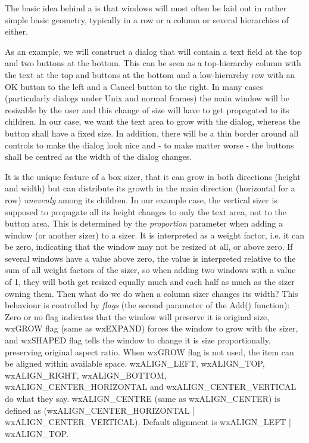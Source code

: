 The basic idea behind a  is that windows will most often be laid out in rather
simple basic geometry, typically in a row or a column or several hierarchies of either.

As an example, we will construct a dialog that will contain a text field at the top and
two buttons at the bottom. This can be seen as a top-hierarchy column with the text at
the top and buttons at the bottom and a low-hierarchy row with an OK button to the left
and a Cancel button to the right. In many cases (particularly dialogs under Unix and
normal frames) the main window will be resizable by the user and this change of size
will have to get propagated to its children. In our case, we want the text area to grow
with the dialog, whereas the button shall have a fixed size. In addition, there will be
a thin border around all controls to make the dialog look nice and - to make matter worse -
the buttons shall be centred as the width of the dialog changes.

It is the unique feature of a box sizer, that it can grow in both directions (height and
width) but can distribute its growth in the main direction (horizontal for a row) {\it unevenly} 
among its children. In our example case, the vertical sizer is supposed to propagate all its
height changes to only the text area, not to the button area. This is determined by the {\it proportion} parameter
when adding a window (or another sizer) to a sizer. It is interpreted
as a weight factor, i.e. it can be zero, indicating that the window may not be resized
at all, or above zero. If several windows have a value above zero, the value is interpreted
relative to the sum of all weight factors of the sizer, so when adding two windows with
a value of 1, they will both get resized equally much and each half as much as the sizer
owning them. Then what do we do when a column sizer changes its width? This behaviour is
controlled by {\it flags} (the second parameter of the Add() function): Zero or no flag
indicates that the window will preserve it is original size, wxGROW flag (same as wxEXPAND)
forces the window to grow with the sizer, and wxSHAPED flag tells the window to change it is
size proportionally, preserving original aspect ratio.  When wxGROW flag is not used,
the item can be aligned within available space.  wxALIGN\_LEFT, wxALIGN\_TOP, wxALIGN\_RIGHT,
wxALIGN\_BOTTOM, wxALIGN\_CENTER\_HORIZONTAL and wxALIGN\_CENTER\_VERTICAL do what they say.
wxALIGN\_CENTRE (same as wxALIGN\_CENTER) is defined as (wxALIGN\_CENTER\_HORIZONTAL |
wxALIGN\_CENTER\_VERTICAL).  Default alignment is wxALIGN\_LEFT | wxALIGN\_TOP.


